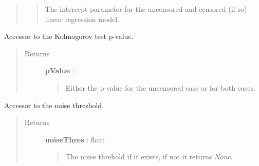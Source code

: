 \documentclass[letterpaper,10pt,english]{sphinxmanual}
\begin{document}
\begin{fulllineitems}
\begin{fulllineitems}
\begin{quote}
\begin{description}
\begin{quote}
The intercept parameter for the uncensored and censored (if so) linear
regression model.
\end{quote}

\end{description}\end{quote}

\end{fulllineitems}


\begin{fulllineitems}
\label{_generated/otpod.UnivariateLinearModelAnalysis:otpod.UnivariateLinearModelAnalysis.getKolmogorovPValue}
Accessor to the Kolmogorov test p-value.
\begin{quote}\begin{description}
\item[{Returns}] \leavevmode
\textbf{pValue} : \href{http://doc.openturns.org/openturns-latest/sphinx/user\_manual/\_generated/openturns.NumericalPoint.html\#openturns.NumericalPoint}{}
\begin{quote}

Either the p-value for the uncensored case or for both cases.
\end{quote}

\end{description}\end{quote}

\end{fulllineitems}


\begin{fulllineitems}
\label{_generated/otpod.UnivariateLinearModelAnalysis:otpod.UnivariateLinearModelAnalysis.getNoiseThreshold}
Accessor to the noise threshold.
\begin{quote}\begin{description}
\item[{Returns}] \leavevmode
\textbf{noiseThres} : float
\begin{quote}

The noise threhold if it exists, if not it returns \emph{None}.
\end{quote}

\end{description}\end{quote}


\end{fulllineitems}
\end{fulllineitems}
\end{document}
